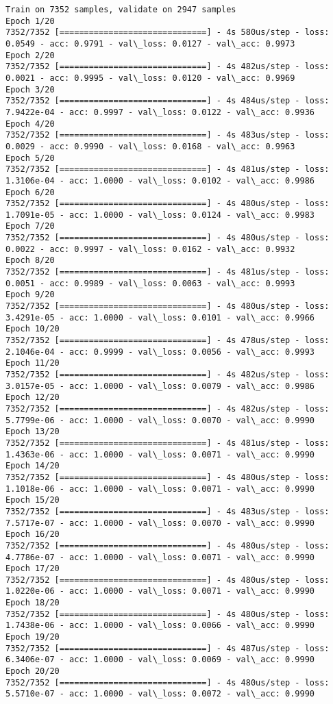 \documentclass[11pt]{article}
\begin{document}
    \begin{Verbatim}[commandchars=\\\{\}]
Train on 7352 samples, validate on 2947 samples
Epoch 1/20
7352/7352 [==============================] - 4s 580us/step - loss: 0.0549 - acc: 0.9791 - val\_loss: 0.0127 - val\_acc: 0.9973
Epoch 2/20
7352/7352 [==============================] - 4s 482us/step - loss: 0.0021 - acc: 0.9995 - val\_loss: 0.0120 - val\_acc: 0.9969
Epoch 3/20
7352/7352 [==============================] - 4s 484us/step - loss: 7.9422e-04 - acc: 0.9997 - val\_loss: 0.0122 - val\_acc: 0.9936
Epoch 4/20
7352/7352 [==============================] - 4s 483us/step - loss: 0.0029 - acc: 0.9990 - val\_loss: 0.0168 - val\_acc: 0.9963
Epoch 5/20
7352/7352 [==============================] - 4s 481us/step - loss: 1.3106e-04 - acc: 1.0000 - val\_loss: 0.0102 - val\_acc: 0.9986
Epoch 6/20
7352/7352 [==============================] - 4s 480us/step - loss: 1.7091e-05 - acc: 1.0000 - val\_loss: 0.0124 - val\_acc: 0.9983
Epoch 7/20
7352/7352 [==============================] - 4s 480us/step - loss: 0.0022 - acc: 0.9997 - val\_loss: 0.0162 - val\_acc: 0.9932
Epoch 8/20
7352/7352 [==============================] - 4s 481us/step - loss: 0.0051 - acc: 0.9989 - val\_loss: 0.0063 - val\_acc: 0.9993
Epoch 9/20
7352/7352 [==============================] - 4s 480us/step - loss: 3.4291e-05 - acc: 1.0000 - val\_loss: 0.0101 - val\_acc: 0.9966
Epoch 10/20
7352/7352 [==============================] - 4s 478us/step - loss: 2.1046e-04 - acc: 0.9999 - val\_loss: 0.0056 - val\_acc: 0.9993
Epoch 11/20
7352/7352 [==============================] - 4s 482us/step - loss: 3.0157e-05 - acc: 1.0000 - val\_loss: 0.0079 - val\_acc: 0.9986
Epoch 12/20
7352/7352 [==============================] - 4s 482us/step - loss: 5.7799e-06 - acc: 1.0000 - val\_loss: 0.0070 - val\_acc: 0.9990
Epoch 13/20
7352/7352 [==============================] - 4s 481us/step - loss: 1.4363e-06 - acc: 1.0000 - val\_loss: 0.0071 - val\_acc: 0.9990
Epoch 14/20
7352/7352 [==============================] - 4s 480us/step - loss: 1.1018e-06 - acc: 1.0000 - val\_loss: 0.0071 - val\_acc: 0.9990
Epoch 15/20
7352/7352 [==============================] - 4s 483us/step - loss: 7.5717e-07 - acc: 1.0000 - val\_loss: 0.0070 - val\_acc: 0.9990
Epoch 16/20
7352/7352 [==============================] - 4s 480us/step - loss: 4.7786e-07 - acc: 1.0000 - val\_loss: 0.0071 - val\_acc: 0.9990
Epoch 17/20
7352/7352 [==============================] - 4s 480us/step - loss: 1.0220e-06 - acc: 1.0000 - val\_loss: 0.0071 - val\_acc: 0.9990
Epoch 18/20
7352/7352 [==============================] - 4s 480us/step - loss: 1.7438e-06 - acc: 1.0000 - val\_loss: 0.0066 - val\_acc: 0.9990
Epoch 19/20
7352/7352 [==============================] - 4s 487us/step - loss: 6.3406e-07 - acc: 1.0000 - val\_loss: 0.0069 - val\_acc: 0.9990
Epoch 20/20
7352/7352 [==============================] - 4s 480us/step - loss: 5.5710e-07 - acc: 1.0000 - val\_loss: 0.0072 - val\_acc: 0.9990

    \end{Verbatim}
\end{document}
